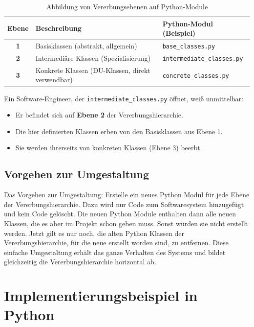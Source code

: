 ﻿\documentclass[a4paper,12pt]{article}
\begin{document}
\begin{table}[h]
	\centering
	\caption{Abbildung von Vererbungsebenen auf Python-Module}
	\label{tab:mapping}
	\begin{tabular}{>{\bfseries}c p{4cm} p{6cm}}
		\toprule
		Ebene & Beschreibung & Python-Modul (Beispiel) \\
		\midrule
		1 & Basisklassen (abstrakt, allgemein) & \texttt{base\_classes.py} \\
		2 & Intermediäre Klassen (Spezialisierung) & \texttt{intermediate\_classes.py} \\
		3 & Konkrete Klassen (DU-Klassen, direkt verwendbar) & \texttt{concrete\_classes.py} \\
		\bottomrule
	\end{tabular}
\end{table}

Ein Software-Engineer, der \texttt{intermediate\_classes.py} öffnet, weiß unmittelbar:
\begin{itemize}
	\item Er befindet sich auf \textbf{Ebene 2} der Vererbungshierarchie.
	\item Die hier definierten Klassen erben von den Basisklassen aus Ebene 1.
	\item Sie werden ihrerseits von konkreten Klassen (Ebene 3) beerbt.
\end{itemize}

\subsection{Vorgehen zur Umgestaltung}
Das Vorgehen zur Umgestaltung: Erstelle ein neues Python Modul für jede Ebene der Vererbungshierarchie. Dazu wird nur Code zum Softwaresystem hinzugefügt und kein Code gelöscht. Die neuen Python Module enthalten dann alle neuen Klassen, die es aber im Projekt schon geben muss. Sonst würden sie nicht erstellt werden. Jetzt gilt es nur noch, die alten Python Klassen der Vererbungshierarchie, für die neue erstellt worden sind, zu entfernen. Diese einfache Umgestaltung erhält das ganze Verhalten des Systems und bildet gleichzeitig die Vererbungshierarchie horizontal ab.

\section{Implementierungsbeispiel in Python}
\end{document}

